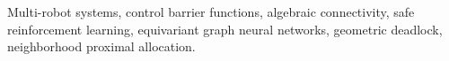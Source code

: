 \documentclass[journal]{IEEEtran}
\begin{document}
\begin{IEEEkeywords}
Multi-robot systems, control barrier functions, algebraic connectivity, safe reinforcement learning, equivariant graph neural networks, geometric deadlock, neighborhood proximal allocation.
\end{IEEEkeywords}










\end{document}
